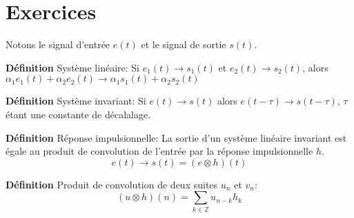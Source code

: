 \documentclass[12pt]{article}
\begin{document}
\section*{Exercices}

Notons le signal d'entrée $e(t)$ et le signal de sortie $s(t)$.


\textbf{Définition} Système linéaire: \newline
Si $e_1(t) \rightarrow s_1(t)$ et $e_2(t) \rightarrow s_2(t)$, alors $\alpha_1 e_1(t) + \alpha_2 e_2(t) \rightarrow \alpha_1 s_1(t) + \alpha_2 s_2(t)$

\textbf{Définition} Système invariant: \newline
Si $e(t) \rightarrow s(t)$ alors $e(t-\tau) \rightarrow s(t-\tau)$, $\tau$ étant une constante de décalalage.

\textbf{Définition} Réponse impulsionnelle: \newline
La sortie d'un système linéaire invariant est égale au produit de convolution de l'entrée par la réponse impulsionnelle $h$. $$e(t) \longrightarrow s(t) = (e \otimes h)(t)$$

\textbf{Définition} Produit de convolution de deux suites $u_n$ et $v_n$: \newline
$$ (u \otimes h)(n) = \sum_{k \in \mathbb{Z}} u_{n-k}h_k $$
\end{document}
